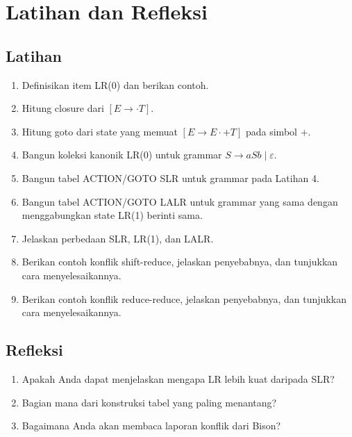 \section*{Latihan dan Refleksi}

\subsection*{Latihan}
\begin{enumerate}[label=\arabic*.,leftmargin=*]
  \item Definisikan item LR(0) dan berikan contoh.
  \item Hitung closure dari \([E \to \cdot T]\).
  \item Hitung goto dari state yang memuat
        \([E \to E \cdot + T]\) pada simbol \(+\).
  \item Bangun koleksi kanonik LR(0) untuk grammar
        \(S \to a S b \mid \varepsilon\).
  \item Bangun tabel ACTION/GOTO SLR untuk grammar pada Latihan 4.
  \item Bangun tabel ACTION/GOTO LALR untuk grammar yang sama dengan
        menggabungkan state LR(1) berinti sama.
  \item Jelaskan perbedaan SLR, LR(1), dan LALR.
  \item Berikan contoh konflik shift-reduce, jelaskan penyebabnya, dan
        tunjukkan cara menyelesaikannya.
  \item Berikan contoh konflik reduce-reduce, jelaskan penyebabnya, dan
        tunjukkan cara menyelesaikannya.
\end{enumerate}

\subsection*{Refleksi}
\begin{reflectionbox}
\begin{enumerate}[label=\arabic*.,leftmargin=*]
  \item Apakah Anda dapat menjelaskan mengapa LR lebih kuat daripada
        SLR?
  \item Bagian mana dari konstruksi tabel yang paling menantang?
  \item Bagaimana Anda akan membaca laporan konflik dari Bison?
\end{enumerate}
\end{reflectionbox}
